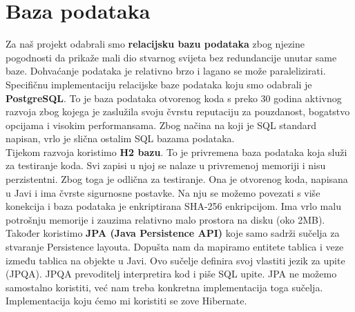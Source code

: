 		\section{Baza podataka}
			
		Za naš projekt odabrali smo \textbf{relacijsku bazu podataka} zbog njezine pogodnosti da prikaže mali dio stvarnog svijeta bez redundancije unutar same baze. Dohvaćanje podataka je relativno brzo i lagano se može paralelizirati. Specifičnu implementaciju relacijske baze podataka koju smo odabrali je \textbf{PostgreSQL}. To je baza podataka otvorenog koda s preko 30 godina aktivnog razvoja zbog kojega je zaslužila svoju čvrstu reputaciju za pouzdanost, bogatstvo opcijama i visokim performansama. Zbog načina na koji je SQL standard napisan, vrlo je slična ostalim SQL bazama podataka.\\ 
		
		Tijekom razvoja koristimo \textbf{H2 bazu}. To je privremena baza podataka koja služi za testiranje koda. Svi zapisi u njoj se nalaze u privremenoj memoriji i nisu perzistentni. Zbog toga je odlična za testiranje. Ona je otvorenog koda, napisana u Javi i ima čvrste sigurnosne postavke. Na nju se možemo povezati s više konekcija i baza podataka je enkriptirana SHA-256 enkripcijom. Ima vrlo malu potrošnju memorije i zauzima relativno malo prostora na disku (oko 2MB). \\ 
		
		Također koristimo \textbf{JPA (Java Persistence API)} koje samo sadrži sučelja za stvaranje Persistence layouta. Dopušta nam da mapiramo entitete tablica i veze između tablica na objekte u Javi. Ovo sučelje definira svoj vlastiti jezik za upite (JPQA). JPQA prevoditelj interpretira kod i piše SQL upite. JPA ne možemo samostalno koristiti, već nam treba konkretna implementacija toga sučelja. Implementacija koju ćemo mi koristiti se zove Hibernate. \\ 
		
